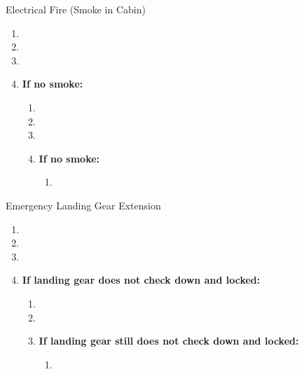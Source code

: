 \begin{checklist_emerg}{Electrical Fire (Smoke in Cabin)}
    \begin{enumerate}
        \item {}
        \item {}
        \item {}
        \item{
            \textbf{If no smoke:}
            \begin{enumerate}
                \item {}
                \item {}
                \item {}
                \item{
                    \textbf{If no smoke:}
                    \begin{enumerate}
                        \item {}

                    \end{enumerate}
                }
            \end{enumerate}
        }
    \end{enumerate}
\end{checklist_emerg}

\begin{checklist_emerg}{Emergency Landing Gear Extension}
    \begin{enumerate}
        \item {}
        \item {}
        \item {}
        \item{
            \textbf{If landing gear does not check down and locked:}
            \begin{enumerate}
                \item {}
                \item {}
                \item \textbf{If landing gear still does not check down and locked:}
                \begin{enumerate}
                    \item {}
                \end{enumerate}
            \end{enumerate}
        }

    \end{enumerate}
\end{checklist_emerg}
